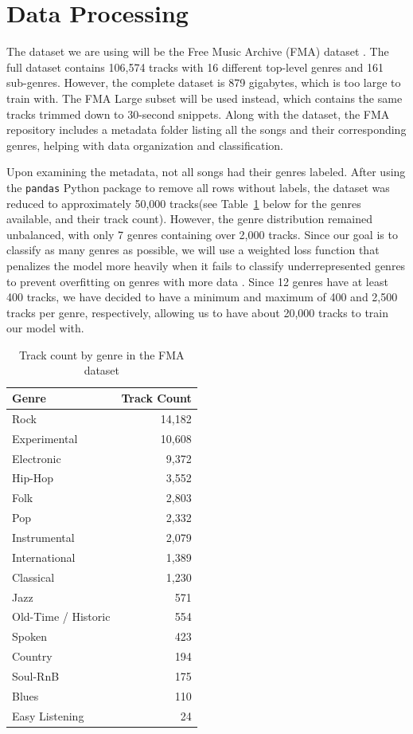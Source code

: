 \documentclass{article} %
\begin{document}
\section{Data Processing}

The dataset we are using will be the Free Music Archive (FMA) dataset \citep{fma_dataset}. The full dataset contains 106,574 tracks with 16 different top-level genres and 161 sub-genres. However, the complete dataset is 879 gigabytes, which is too large to train with. The FMA Large subset will be used instead, which contains the same tracks trimmed down to 30-second snippets. Along with the dataset, the FMA repository includes a metadata folder listing all the songs and their corresponding genres, helping with data organization and classification.

Upon examining the metadata, not all songs had their genres labeled. After using the \texttt{pandas} Python package to remove all rows without labels, the dataset was reduced to approximately 50,000 tracks(see Table~\ref{tab:genre_counts} below for the genres available, and their track count). However, the genre distribution remained unbalanced, with only 7 genres containing over 2,000 tracks. Since our goal is to classify as many genres as possible, we will use a weighted loss function that penalizes the model more heavily when it fails to classify underrepresented genres to prevent overfitting on genres with more data \citep{tantai_weighted}. Since 12 genres have at least 400 tracks, we have decided to have a minimum and maximum of 400 and 2,500 tracks per genre, respectively, allowing us to have about 20,000 tracks to train our model with.

\begin{table}[h]
\centering
\caption{Track count by genre in the FMA dataset}
\label{tab:genre_counts}
\begin{tabular}{lr}
\toprule
\textbf{Genre} & \textbf{Track Count} \\
\midrule
Rock                & 14,182 \\
Experimental        & 10,608 \\
Electronic          & 9,372 \\
Hip-Hop             & 3,552 \\
Folk                & 2,803 \\
Pop                 & 2,332 \\
Instrumental        & 2,079 \\
International       & 1,389 \\
Classical           & 1,230 \\
Jazz                & 571 \\
Old-Time / Historic & 554 \\
Spoken              & 423 \\
Country             & 194 \\
Soul-RnB            & 175 \\
Blues               & 110 \\
Easy Listening      & 24 \\
\bottomrule
\end{tabular}
\end{table}
\end{document}
